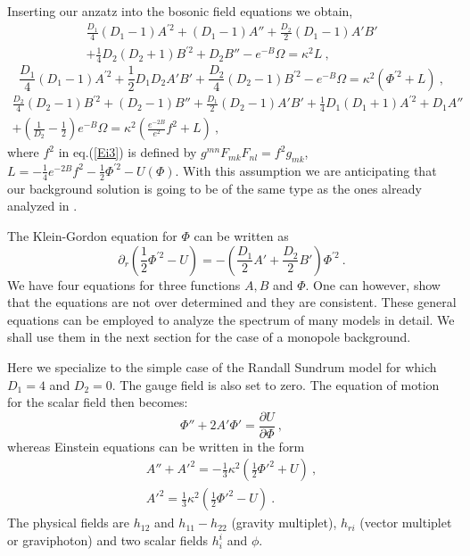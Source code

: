\documentclass[a4paper,12pt]{article}
\begin{document}
Inserting our anzatz into the bosonic field equations we obtain,
\begin{eqnarray}
\frac{D_1}{4}(D_1-1)A^{'2} + (D_1-1)A'' +\frac{D_2}{2}(D_1-1)A'B'
\nonumber
\\
+\frac{1}{4}D_2(D_2+1)B^{'2} + D_2B'' -e^{-B}\Omega=\kappa^2 L~,
\label{Ei1}
\end{eqnarray}
\begin{equation}
\frac{D_1}{4}(D_1-1)A^{'2} + \frac{1}{2}D_1D_2A'B'
+\frac{D_2}{4}(D_2-1)B^{'2} -e^{-B}\Omega=\kappa^2(\Phi^{'2}+L)~,
\label{Ei2}
\end{equation}
\begin{eqnarray}
\frac{D_2}{4}(D_2-1)B^{'2} + (D_ 2-1)B'' +\frac{D_1}{2}(D_2-1)A'B' +
\frac{1}{4}D_1(D_1+1)A^{'2} + D_1A''
\nonumber
\\
+(\frac{1}{D_2}-
\frac{1}{2}) e^{-B}\Omega=
 \kappa^2\left(\frac{ e^{-2B}}{e^2}f^2 +L\right)~,
\label{Ei3}
\end{eqnarray}
where $f^2$ in  eq.(\ref{Ei3}) is defined by $g^{mn}F_{mk}F_{nl}= f^2
g_{mk}$, $L=-\frac{1}{4}e^{-2B}f^2 - \frac{1}{2}\Phi^{'2}-U(\Phi)$.
With this assumption we are anticipating that our background solution
is going to be of the same type as the ones already analyzed in
\cite{Randjbar-Daemi:2000ft}.

The Klein-Gordon equation for $\Phi$ can be written as
\begin{equation}
\partial_r (\frac{1}{2}\Phi^{'2} -U) = -(\frac{D_1}{2}A' +
\frac{D_2}{2}B')\Phi^{'2}~.
\end{equation}
We have four equations for three functions $A, B$ and $\Phi$. One can
however, show that the equations are not over determined and they are
consistent. These general equations can be employed to  analyze the
spectrum of many models in detail. We shall use them in the next
section for the case of a monopole background.

Here we specialize to the simple case of the Randall Sundrum model
for which $D_1=4$ and $D_2=0$. The gauge field is also set to zero.
The equation of motion for the scalar field then becomes:
\begin{equation}
\Phi'' + 2 A'\Phi' = \frac{\partial U}{\partial\Phi}~,
\label{scrs}
\end{equation}
whereas Einstein equations can be written in the form
\begin{eqnarray}
A''+{A'}^2=-\frac{1}{3}\kappa^2\left(
\frac{1}{2}{\Phi'}^2 +U \right)~,\\
{A'}^2=\frac{1}{3}\kappa^2\left(
\frac{1}{2}{\Phi'}^2 -U \right)~.
\label{einrs}
\end{eqnarray}
The physical fields are $h_{12}$ and $h_{11}-h_{22}$ (gravity
multiplet), $h_{ri}$ (vector multiplet or graviphoton) and two scalar
fields  $h^i_i$ and $\phi$.
\end{document}
